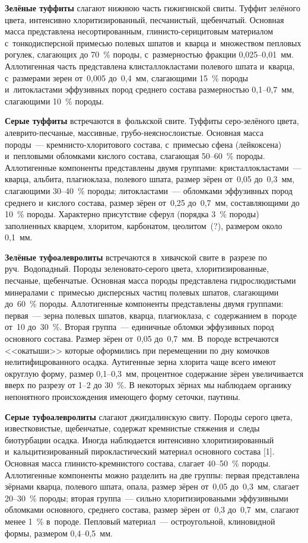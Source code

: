 \textbf{Зелёные туффиты} слагают нижнюю часть гижигинской свиты. Туффит зелёного цвета, интенсивно хлоритизированный, песчанистый, щебенчатый. Основная масса представлена несортированным, глинисто-серицитовым материалом с~тонкодисперсной примесью полевых шпатов и~кварца и~множеством пепловых рогулек, слагающих до 70~\% породы, с~размерностью фракции 0,025--0,01~мм. Аллотигенная часть представлена клисталлокластами полевого шпата и~кварца, с~размерами зерен от~0,005 до~0,4~мм, слагающими 15~\% породы и~литокластами эффузивных пород среднего состава размерностью 0,1--0,7~мм, слагающими 10~\% породы. \enlargethispage{2\baselineskip}

\textbf{Серые туффиты} встречаются в~фолькской свите. Туффиты серо-зелёного цвета, алеврито-песчаные, массивные, грубо-неяснослоистые. Основная масса породы~--- крем\-ни\-сто-хло\-ри\-то\-во\-го состава, с~примесью сфена (лейкоксена) и~пепловыми обломками кислого состава, слагающая 50--60~\% породы. Аллотигенные компоненты представлены двумя группами: кристаллокластами~--- кварца, альбита, плагиоклаза, полевого шпата, размер зёрен от~0,05 до~0,3~мм, слагающими 30--40~\% породы; литокластами~--- обломками эффузивных пород среднего и~кислого состава, размер зёрен от~0,25 до~0,7~мм, составляющими до 10~\% породы. Характерно присутствие сферул (порядка 3~\% породы) заполненных кварцем, хлоритом, карбонатом, цеолитом~(?), размером около 0,1~мм.


\textbf{Зелёные туфоалевролиты} встречаются в~хивачской свите в~разрезе по руч.~Водопадный. Породы зеленовато-серого цвета, хлоритизированные, песчаные, щебенчатые. Основная масса породы представлена гидрослюдистыми минералами с~примесью дисперсных частиц полевых шпатов, слагающими до~60~\% породы. Аллотигенные компоненты представлены двумя группами: первая~--- зерна полевых шпатов, кварца, плагиоклаза, с~содержанием в~породе от~10 до~30~\%. Вторая группа~--- единичные обломки эффузивных пород основного состава. Размер зёрен от~0,05 до~0,7~мм. В~породе встречаются <<окатыши>> которые оформились при перемещении по дну комочков нелитифицрованного осадка. Аутигенные зерна хлорита чаще всего имеют округлую форму, размер 0,1--0,3~мм, процентное содержание зёрен увеличивается вверх по разрезу от 1--2 до 30~\%. В некоторых зёрнах мы наблюдаем органику непонятного происхождения имеющего форму сеточки, паутины.

\textbf{Серые туфоалевролиты} слагают джигдалинскую свиту. Породы серого цвета, известковистые, щебенчатые, содержат кремнистые стяжения и~следы биотурбации осадка. Иногда наблюдается интенсивно хлоритизированный и~кальцитизированный пирокластический материал основного состава [1]. Основная масса глинисто-кремнистого состава, слагает 40--50~\% породы. Аллотигенные компоненты можно разделить на две группы: первая представлена зёрнами кварца, полевого шпата, опала, размер зёрен от~0,05 до~0,3~мм, слагает 20--30~\% породы; вторая группа~--- сильно хлоритизироваными эффузивными обломками основного, среднего состава, размер зёрен от~0,3 до~0,7~мм, слагают менее 1~\% в~породе. Пепловый материал~--- остроугольной, клиновидной формы, размером 0,4--0,5~мм.

